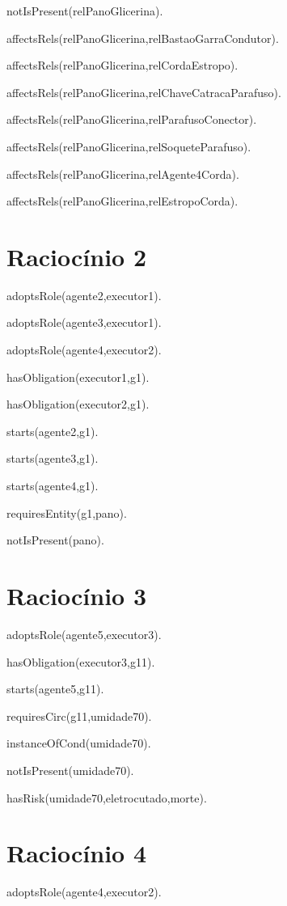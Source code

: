 notIsPresent(relPanoGlicerina).

affectsRels(relPanoGlicerina,relBastaoGarraCondutor).

affectsRels(relPanoGlicerina,relCordaEstropo).

affectsRels(relPanoGlicerina,relChaveCatracaParafuso).

affectsRels(relPanoGlicerina,relParafusoConector).

affectsRels(relPanoGlicerina,relSoqueteParafuso).

affectsRels(relPanoGlicerina,relAgente4Corda).

affectsRels(relPanoGlicerina,relEstropoCorda).


\section{Raciocínio 2}

adoptsRole(agente2,executor1). 

adoptsRole(agente3,executor1).	 	

adoptsRole(agente4,executor2).	 

hasObligation(executor1,g1).

hasObligation(executor2,g1).

starts(agente2,g1). 

starts(agente3,g1).	 	

starts(agente4,g1).

requiresEntity(g1,pano).		

notIsPresent(pano).

\section{Raciocínio 3}


adoptsRole(agente5,executor3).

hasObligation(executor3,g11).	

starts(agente5,g11).

requiresCirc(g11,umidade70).

instanceOfCond(umidade70).

notIsPresent(umidade70).

hasRisk(umidade70,eletrocutado,morte).

\section{Raciocínio 4}

adoptsRole(agente4,executor2).

